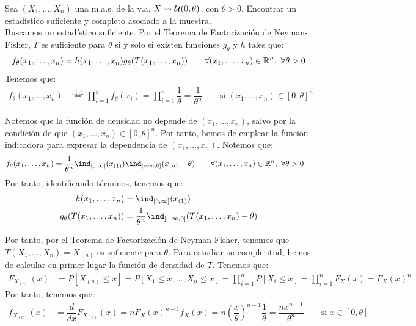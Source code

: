 \begin{ejemplo}
    Sea $(X_1, \ldots, X_n)$ una m.a.s. de la v.a. $X \rightsquigarrow 
    \mathcal{U}(0, \theta)$, con $\theta > 0$. Encontrar un estadístico suficiente y completo asociado a la muestra.\\
    
    
    Buscamos un estadístico suficiente. Por el Teorema de Factorización de Neyman-Fisher, $T$ es suficiente para $\theta$ si y solo si existen funciones $g_\theta$ y $h$ tales que:
    \begin{equation*}
        f_\theta(x_1, \ldots, x_n) = h(x_1, \ldots, x_n) g_\theta(T(x_1, \ldots, x_n)) \qquad \forall (x_1, \ldots, x_n)\in\mathbb{R}^n,\ \forall \theta > 0
    \end{equation*}
    Tenemos que:
    \begin{align*}
        f_\theta(x_1, \ldots, x_n) &\stackrel{\text{i.i.d.}}{=} \prod_{i=1}^n f_\theta(x_i) = \prod_{i=1}^n \dfrac{1}{\theta} = \dfrac{1}{\theta^n}\qquad \text{si } (x_1, \ldots, x_n)\in [0, \theta]^n
    \end{align*}

    Notemos que la función de densidad no depende de $(x_1, \ldots, x_n)$, salvo por la condición de que $(x_1, \ldots, x_n)\in [0, \theta]^n$. Por tanto, hemos de emplear la función indicadora para expresar la dependencia de $(x_1, \ldots, x_n)$. Notemos que:
    \begin{align*}
        f_\theta(x_1, \ldots, x_n) & = \dfrac{1}{\theta^n} \ind_{[0,\infty]}(x_{(1)}) \ind_{\left]-\infty, 0\right]}(x_{(n)}-\theta)\qquad \forall (x_1, \ldots, x_n)\in\bb{R}^n,\ \forall \theta > 0
    \end{align*}
    Por tanto, identificando términos, tenemos que:
    \begin{align*}
        h(x_1, \ldots, x_n) &= \ind_{[0,\infty]}(x_{(1)}) \\
        g_\theta(T(x_1, \ldots, x_n)) &= \dfrac{1}{\theta^n} \ind_{\left]-\infty, 0\right]}(T(x_1, \ldots, x_n)-\theta)
    \end{align*} 

    Por tanto, por el Teorema de Factorización de Neyman-Fisher, tenemos que $T(X_1, \ldots, X_n) = X_{(n)}$ es suficiente para $\theta$. Para estudiar su completitud, hemos de calcular en primer lugar la función de densidad de $T$. Tenemos que:
    \begin{align*}
        F_{X_{(n)}}(x) &= P[X_{(n)} \leq x] = P[X_1\leq x, \ldots, X_n\leq x] = \prod_{i=1}^n P[X_i\leq x] = \prod_{i=1}^n F_X(x) = F_X(x)^n
    \end{align*}
    Por tanto, tenemos que:
    \begin{align*}
        f_{X_{(n)}}(x) &= \dfrac{d}{dx} F_{X_{(n)}}(x) = n F_X(x)^{n-1} f_X(x) = n \left(\dfrac{x}{\theta}\right)^{n-1} \dfrac{1}{\theta} = \dfrac{n x^{n-1}}{\theta^n} \qquad \text{si } x\in [0, \theta]
    \end{align*}


\end{ejemplo}
